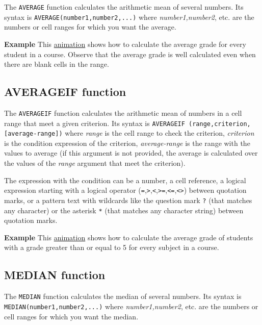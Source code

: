 The \texttt{AVERAGE} function calculates the arithmetic mean of several numbers. Its syntax is \texttt{AVERAGE(number1,number2,...)} where \emph{number1,number2}, etc. are the numbers or cell ranges for which you want the average.

\textbf{Example} This \href{http://aprendeconalf.es/office/excel/manual/img/example_function_average.gif}{animation} shows how to calculate the average grade for every student in a course. Observe that the average grade is well calculated even when there are blank cells in the range.

\subsection{AVERAGEIF function}\hypertarget{averageif-function}{}\label{averageif-function}

The \texttt{AVERAGEIF} function calculates the arithmetic mean of numbers in a cell range that meet a given criterion. Its syntax is \texttt{AVERAGEIF	(range,criterion,[average-range])} where \emph{range} is the cell range to check the criterion, \emph{criterion} is the condition expression of the criterion, \emph{average-range} is the range with the values to average (if this argument is not provided, the average is calculated over the values of the \emph{range} argument that meet the criterion).

The expression with the condition can be a number, a cell reference, a logical expression starting with a logical operator (\texttt{=},\texttt{\textgreater{}},\texttt{\textless{}},\texttt{\textgreater{}=},\texttt{\textless{}=},\texttt{\textless{}\textgreater{}}) between quotation marks, or a pattern text with wildcards like the question mark \texttt{?} (that matches any character) or the asterisk \texttt{*} (that matches any character string) between quotation marks.

\textbf{Example} This \href{http://aprendeconalf.es/office/excel/manual/img/example_function_averageif.gif}{animation} shows how to calculate the average grade of students with a grade greater than or equal to 5 for every subject in a course.

\subsection{MEDIAN function}\hypertarget{median-function}{}\label{median-function}

The \texttt{MEDIAN} function calculates the median of several numbers. Its syntax is \texttt{MEDIAN(number1,number2,...)} where \emph{number1,number2}, etc. are the numbers or cell ranges for which you want the median.

